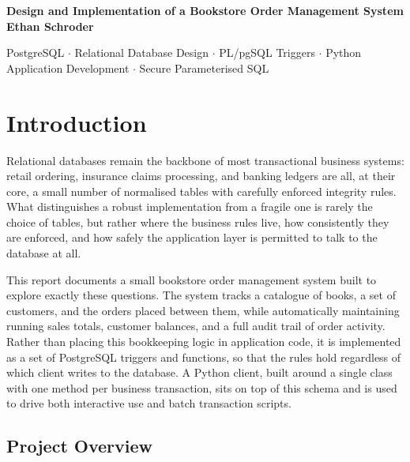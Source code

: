 \documentclass[12pt]{article}
\begin{document}
\begin{center}
\vspace*{4cm}
{\Huge \bf{Design and Implementation of a Bookstore Order Management System}}\\
\vspace{2.5cm}
{\LARGE \bf{ Ethan Schroder }}\\
\vspace*{6cm}

{\large PostgreSQL $\cdot$ Relational Database Design $\cdot$ PL/pgSQL Triggers $\cdot$ Python Application Development $\cdot$ Secure Parameterised SQL}
\end{center}

\newpage

\tableofcontents
\newpage

\section{Introduction}

Relational databases remain the backbone of most transactional business systems: retail ordering, insurance claims processing, and banking ledgers are all, at their core, a small number of normalised tables with carefully enforced integrity rules. What distinguishes a robust implementation from a fragile one is rarely the choice of tables, but rather where the business rules live, how consistently they are enforced, and how safely the application layer is permitted to talk to the database at all.

This report documents a small bookstore order management system built to explore exactly these questions. The system tracks a catalogue of books, a set of customers, and the orders placed between them, while automatically maintaining running sales totals, customer balances, and a full audit trail of order activity. Rather than placing this bookkeeping logic in application code, it is implemented as a set of PostgreSQL triggers and functions, so that the rules hold regardless of which client writes to the database. A Python client, built around a single class with one method per business transaction, sits on top of this schema and is used to drive both interactive use and batch transaction scripts.

\subsection{Project Overview}
\end{document}
